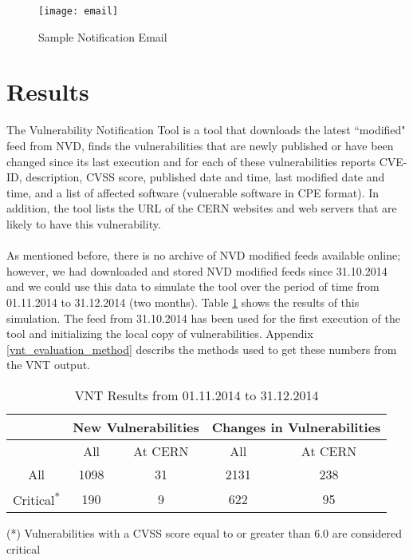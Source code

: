\begin{figure}[h!]
  \centering
    \texttt{[image: email]}
  \caption{Sample Notification Email}
 \label{figure:email_output}

\end{figure}


\section{Results}
The Vulnerability Notification Tool is a tool that downloads the latest ``modified" feed from NVD, finds the vulnerabilities that are newly published or have been changed since its last execution and for each of these vulnerabilities reports CVE-ID, description, CVSS score, published date and time, last modified date and time, and a list of affected software (vulnerable software in CPE format). In addition, the tool lists the URL of the CERN websites and web servers that are likely to have this vulnerability. 
\paragraph{}
As mentioned before, there is no archive of NVD modified feeds available online; however, we had downloaded and stored NVD modified feeds since 31.10.2014 and we could use this data to simulate the tool over the period of time from 01.11.2014 to 31.12.2014 (two months). Table \ref{table:vnt_results} shows the results of this simulation. The feed from 31.10.2014 has been used for the first execution of the tool and initializing the local copy of vulnerabilities. Appendix \ref{vnt_evaluation_method} describs the methods used to get these numbers from the VNT output.

\begin{table}
\begin{center}
    \begin{tabular}{ | c || c | c || c | c |}
    
    \hline
	 
     &  \multicolumn{2}{c||}{New Vulnerabilities} &  \multicolumn{2}{c|}{Changes in Vulnerabilities}  
	\\ \hline   
      &  All &  At CERN &  All &  At CERN
    \\ 
	\hline    
       All & \multicolumn{1}{|c|}{\cellcolor{red!25}1098}   &  31 & \multicolumn{1}{|c|}{\cellcolor{red!25}2131}  & 238 
   \\ \hhline{|*5-}
\hhline{~~|-|~|-|}
Critical\textsuperscript{*} & 190  & \multicolumn{1}{|c||}{\cellcolor{green!25}9}  & 622  & \multicolumn{1}{|c|}{\cellcolor{green!25}95  }
    \\ \hline
    \end{tabular}
    \caption{VNT Results from 01.11.2014 to 31.12.2014}
    \label{table:vnt_results}
   \end{center}
   \footnotesize{(*) Vulnerabilities with a CVSS score equal to or greater than 6.0 are considered critical}
    \end{table}



